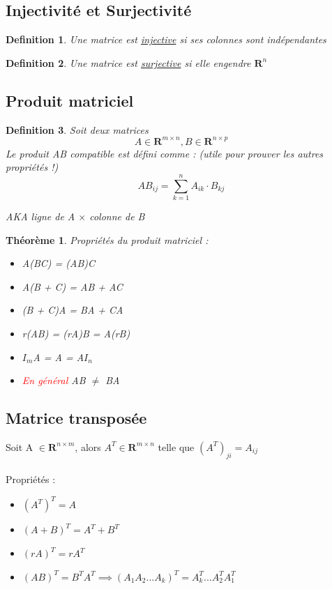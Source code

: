 \documentclass{article}
\newtheorem{definition}{Definition}[section]
\newtheorem{theorem}{Théorème}[section]
\begin{document}
\subsection{Injectivité et Surjectivité}
\begin{definition}
    Une matrice est \underline{injective} si ses colonnes sont indépendantes 
\end{definition}
\begin{definition}
    Une matrice est \underline{surjective} si elle engendre $\mathbf{R}^n$ 
\end{definition}
\subsection{Produit matriciel}
\begin{definition}
    Soit deux matrices \[ A \in \mathbf{R}^{m\times{n}},  B \in \mathbf{R}^{n\times{p}} \]
    Le produit AB compatible est défini comme : (utile pour prouver les autres propriétés !)
    \[ AB_{ij} = \sum^{n}_{k=1} A_{ik} \cdot B_{kj} \]

    AKA ligne de A $\times$ colonne de B
\end{definition}
\begin{theorem}
Propriétés du produit matriciel :
\begin{multicols}{2}
\begin{itemize}
    \item A(BC) = (AB)C
    \item A(B + C) = AB + AC
    \item (B + C)A = BA + CA
    \columnbreak
    \item r(AB) = (rA)B = A(rB)
    \item $I_m$A = A = A$I_n$
    \item \textcolor{red}{En général} AB $\neq$ BA
\end{itemize}
\end{multicols}
\end{theorem}
\subsection{Matrice transposée}
Soit A $ \in \mathbf{R}^{n \times m}$, alors $A^T \in \mathbf{R}^{m \times n}$ telle que $(A^T)_{ji} = A_{ij}$ \\\\
Propriétés :
\begin{itemize}
    \item $(A^T)^T = A$
    \item $(A + B)^T = A^T + B^T$
    \item $(rA)^T = rA^T$
    \item $(AB)^T = B^TA^T \implies (A_1A_2...A_k)^T = A_k^T...A_2^TA_1^T$ 
\end{itemize}
\end{document}
